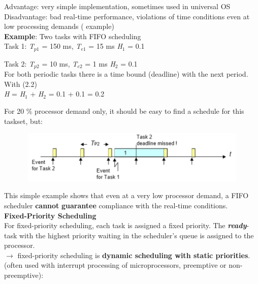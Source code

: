 Advantage:   very simple implementation, sometimes used in universal OS\\

Disadvantage:  bad real-time performance,        violations of time conditions even at low processing demands ( example)\\

\textbf{Example}: Two tasks with FIFO scheduling\\

Task 1: \textit{T}${}_{p1}$ = 150 ms, \textit{T}${}_{e1}$ = 15 ms   \textit{H}${}_{1}$ = 0.1

Task 2: \textit{T}${}_{p2}$ = 10 ms,  \textit{T}${}_{e2}$ = 1 ms    \textit{H}${}_{2}$ = 0.1\\

For both periodic tasks there is a time bound (deadline) with the next period. With (2.2) \\

\textit{H} = \textit{H}${}_{1}$ + \textit{H}${}_{2}$ = 0.1 + 0.1 = 0.2 

For 20 \% processor demand only, it should be easy to find a schedule for this taskset, but:

 	\begin{figure}[h]
    \centering
    \includegraphics[width=12cm, height=2.5cm]{Images/image98.png}
    \label{fig:Fig 43}
    \end{figure}

This simple example shows that even at a very low processor demand, a FIFO scheduler \textbf{cannot} \textbf{guarantee} compliance with the real-time conditions.\\

{\rot\bf Fixed-Priority Scheduling}\\

For fixed-priority scheduling, each task is assigned a fixed priority. The \textbf{\textit{ready}}-task with the highest priority waiting in the scheduler's queue is assigned to the processor.  \\
$\rightarrow$ fixed-priority scheduling is\textbf{ dynamic scheduling with static priorities}. (often used with interrupt processing of microprocessors, preemptive or non-preemptive):

